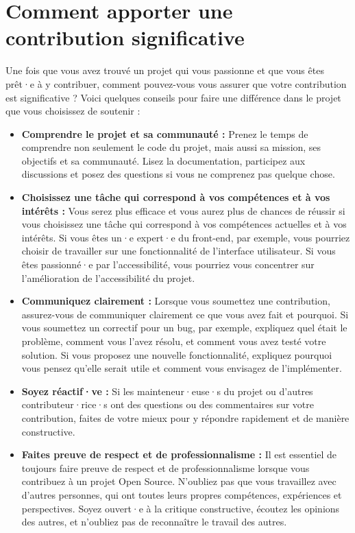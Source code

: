 \section{Comment apporter une contribution significative}

Une fois que vous avez trouvé un projet qui vous passionne et que vous êtes prêt·e à y contribuer, comment pouvez-vous vous assurer que votre contribution est significative ? Voici quelques conseils pour faire une différence dans le projet que vous choisissez de soutenir :

\begin{itemize}
    \item \textbf{Comprendre le projet et sa communauté :} Prenez le temps de comprendre non seulement le code du projet, mais aussi sa mission, ses objectifs et sa communauté. Lisez la documentation, participez aux discussions et posez des questions si vous ne comprenez pas quelque chose.

    \item \textbf{Choisissez une tâche qui correspond à vos compétences et à vos intérêts :} Vous serez plus efficace et vous aurez plus de chances de réussir si vous choisissez une tâche qui correspond à vos compétences actuelles et à vos intérêts. Si vous êtes un·e expert·e du front-end, par exemple, vous pourriez choisir de travailler sur une fonctionnalité de l'interface utilisateur. Si vous êtes passionné·e par l'accessibilité, vous pourriez vous concentrer sur l'amélioration de l'accessibilité du projet.

    \item \textbf{Communiquez clairement :} Lorsque vous soumettez une contribution, assurez-vous de communiquer clairement ce que vous avez fait et pourquoi. Si vous soumettez un correctif pour un bug, par exemple, expliquez quel était le problème, comment vous l'avez résolu, et comment vous avez testé votre solution. Si vous proposez une nouvelle fonctionnalité, expliquez pourquoi vous pensez qu'elle serait utile et comment vous envisagez de l'implémenter.

    \item \textbf{Soyez réactif·ve :} Si les mainteneur·euse·s du projet ou d'autres contributeur·rice·s ont des questions ou des commentaires sur votre contribution, faites de votre mieux pour y répondre rapidement et de manière constructive.

    \item \textbf{Faites preuve de respect et de professionnalisme :} Il est essentiel de toujours faire preuve de respect et de professionnalisme lorsque vous contribuez à un projet Open Source. N'oubliez pas que vous travaillez avec d'autres personnes, qui ont toutes leurs propres compétences, expériences et perspectives. Soyez ouvert·e à la critique constructive, écoutez les opinions des autres, et n'oubliez pas de reconnaître le travail des autres.
\end{itemize}


